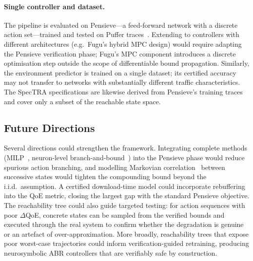 \documentclass[thesis]{uofithesis} %
\begin{document}
    \paragraph{Single controller and dataset.}
    The pipeline is evaluated on Pensieve---a feed-forward network with
    a discrete action set---trained and tested on Puffer
    traces~\cite{fugu}.  Extending to controllers with different
    architectures (e.g.\ Fugu's hybrid MPC design) would require
    adapting the Pensieve verification phase; Fugu's MPC component
    introduces a discrete optimisation step outside the scope of
    differentiable bound propagation.  Similarly, the environment
    predictor is trained on a single dataset; its certified accuracy
    may not transfer to networks with substantially different traffic
    characteristics.  The SpecTRA specifications are likewise derived
    from Pensieve's training traces and cover only a subset of the
    reachable state space.


    \subsection{Future Directions}
    \label{sec:disc-future}

    Several directions could strengthen the framework.
    Integrating complete methods (MILP~\cite{bab}, neuron-level
    branch-and-bound~\cite{abcrown}) into the Pensieve phase would
    reduce spurious action branching, and modelling Markovian
    correlation~\cite{markov} between successive states would tighten
    the compounding bound beyond the i.i.d.\ assumption.  A certified
    download-time model could incorporate rebuffering into the QoE
    metric, closing the largest gap with the standard Pensieve objective.
    The reachability tree could also guide targeted testing: for action
    sequences with poor $\Delta$QoE, concrete states can be sampled from
    the verified bounds and executed through the real system to confirm
    whether the degradation is genuine or an artefact of
    over-approximation.  More broadly, reachability trees that expose
    poor worst-case trajectories could inform verification-guided
    retraining, producing neurosymbolic ABR controllers that are
    verifiably safe by construction.


\end{document}
